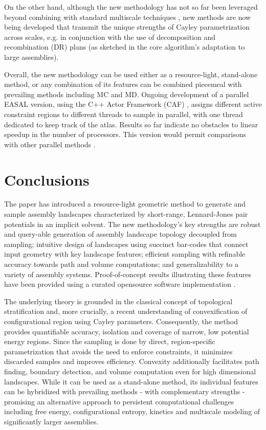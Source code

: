 \documentclass[]{article}
\begin{document}
On the other hand, although the new methodology has not so far been leveraged
beyond combining with standard multiscale techniques
\cite{sitharam:Assembly,virus2019}, new methods are now being developed that
transmit the unique strengths of Cayley parametrization across scales, e.g. in
conjunction with the use of decomposition and recombination (DR) plans (as
sketched in the core algorithm's adaptation to large assemblies).

Overall, the new methodology can be used either as a resource-light,
stand-alone method, or any combination of its features can be combined
piecemeal with prevailing methods including MC and MD. Ongoing development of a
parallel EASAL version, using the C++ Actor Framework (CAF)
\cite{cshw-nassp-13,chs-rapc-16}, assigns different active constraint regions
to different threads to sample in parallel, with one thread dedicated to keep
track of the atlas. Results so far indicate no obstacles to linear speedup in
the number of processors. This version would permit comparisons with other
parallel methods \cite{cha2015accelerated,Griffiths2019}.

\section{Conclusions}
\label{sec:conclusion}
The paper has introduced a resource-light geometric method to generate and
sample assembly landscapes characterized by short-range, Lennard-Jones pair
potentials in an implicit solvent. The new methodology's key strengths are
robust and query-able generation of assembly landscape topology decoupled from
sampling; intuitive design of landscapes using succinct bar-codes that connect
input geometry with key landscape features; efficient sampling with refinable
accuracy towards path and volume computations; and generalizability to a
variety of assembly systems. Proof-of-concept results illustrating these
features have been provided using a curated opensource software implementation
\cite{Ozkan:toms}. 

The underlying theory is grounded in the classical concept of topological
stratification and, more crucially, a recent understanding of convexification
of configurational region using Cayley parameters. Consequently, the method
provides quantifiable accuracy, isolation and coverage of narrow, low potential
energy regions. Since the sampling is done by direct, region-specific
parametrization that avoids the need to enforce constraints, it minimizes
discarded samples and improves efficiency. Convexity additionally facilitates
path finding, boundary detection, and volume computation even for high
dimensional landscapes. While it can be used as a stand-alone method, its
individual features can be hybridized with prevailing methods - with
complementary strengths - promising an alternative approach to persistent
computational challenges including free energy, configurational entropy,
kinetics and multiscale modeling of significantly larger assemblies.
\end{document}
